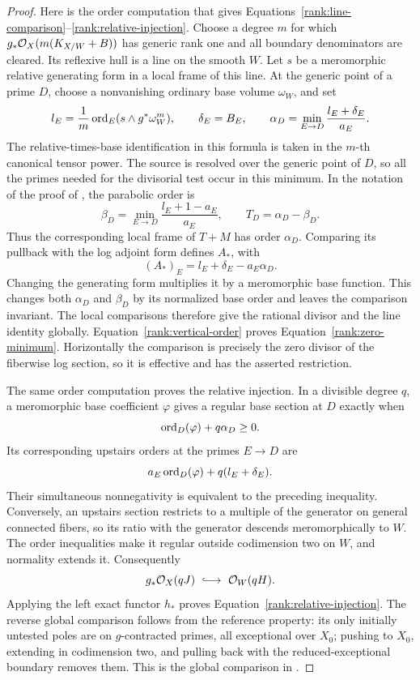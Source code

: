 \begin{proof}
Here is the order computation that gives
Equations~\eqref{rank:line-comparison}--\eqref{rank:relative-injection}.
Choose a degree \(m\) for which
\(g_*\mathcal O_X(m(K_{X/W}+B))\) has generic rank one and all boundary
denominators are cleared.  Its reflexive hull is a line on the smooth
\(W\).  Let \(s\) be a meromorphic relative generating form in a
local frame of this line.  At the generic point of a prime \(D\),
choose a nonvanishing ordinary base volume \(\omega_W\), and set
\[
 l_E=\frac1m\operatorname{ord}_E(s\wedge g^*\omega_W^m),\qquad
 \delta_E=B_E,\qquad
 \alpha_D=\min_{E\to D}\frac{l_E+\delta_E}{a_E}.
\]
The relative-times-base identification in this formula is taken in
the \(m\)-th canonical tensor power.  The source is resolved over
the generic point of \(D\), so all the primes needed for the
divisorial test occur in this minimum.  In the notation of the
proof of \cite[Proposition~2.7]{CI}, the parabolic order is
\[
 \beta_D=\min_{E\to D}\frac{l_E+1-a_E}{a_E},
                    \qquad T_D=\alpha_D-\beta_D.
\]
Thus the corresponding local frame of \(T+M\) has order
\(\alpha_D\).  Comparing its pullback with the log adjoint form
defines \(A_*\), with
\begin{equation}
                (A_*)_E=l_E+\delta_E-a_E\alpha_D .
\label{rank:vertical-order}
\end{equation}
Changing the generating form multiplies it by a meromorphic base
function.  This changes both \(\alpha_D\) and \(\beta_D\) by its
normalized base order and leaves the comparison invariant.  The local
comparisons therefore give the rational divisor and the line identity
globally.  Equation~\eqref{rank:vertical-order} proves
Equation~\eqref{rank:zero-minimum}.  Horizontally the comparison is
precisely the zero divisor of the fiberwise log section, so it is
effective and has the asserted restriction.

The same order computation proves the relative injection.
In a divisible degree \(q\), a meromorphic base coefficient
\(\varphi\) gives a regular base section at \(D\) exactly when
\[
                     \operatorname{ord}_D(\varphi)+q\alpha_D\geq0.
\]
Its corresponding upstairs orders at the primes \(E\to D\) are
\[
             a_E\operatorname{ord}_D(\varphi)+q(l_E+\delta_E).
\]
Their simultaneous nonnegativity is equivalent to the preceding
inequality.  Conversely, an upstairs section restricts to a multiple
of the generator on general connected fibers, so its ratio with the
generator descends meromorphically to \(W\).  The order inequalities
make it regular outside codimension two on \(W\), and normality
extends it.  Consequently
\[
                 g_*\OO_X(qJ)\ \lhook\joinrel\longrightarrow\
                 \OO_W(qH).
\]
Applying the left exact functor \(h_*\) proves
Equation~\eqref{rank:relative-injection}.  The reverse global
comparison follows from the reference property: its only initially
untested poles are on \(g\)-contracted primes, all exceptional over
\(X_0\); pushing to \(X_0\), extending in codimension two, and pulling
back with the reduced-exceptional boundary removes them.  This is
the global comparison in \cite[Proposition~2.7]{CI}.


\end{proof}
